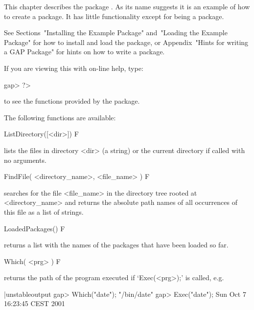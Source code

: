 

This chapter  describes  the  {\GAP}  package  {\Example}.  As  its  name
suggests it is an example of how to  create  a  {\GAP}  package.  It  has
little functionality except for being a package.

See Sections~"Installing the Example Package"  and~"Loading  the  Example
Package"  for  how  to  install  and  load  the  {\Example}  package,  or
Appendix~"Hints for writing a GAP Package" for hints on how  to  write  a
{\GAP} package.

If you are viewing this with on-line help, type: 

\beginexample
gap> ?>
\endexample

to see the functions provided by the {\Example} package.


The following functions are available:

\>ListDirectory([<dir>]) F

lists the files in directory <dir> (a string) or the current directory if
called with no arguments.

\>FindFile( <directory_name>, <file_name> ) F

searches  for the  file   <file_name> in  the  directory  tree  rooted at
<directory_name> and returns the absolute path names of  all  occurrences
of this file as a list of strings.

\>LoadedPackages() F

returns a list with the names of the packages that have  been  loaded  so
far.

\>Which( <prg> ) F

returns the path of the program executed if `Exec(<prg>);' is called, e.g.

\beginexample|unstableoutput
gap> Which("date");         
"/bin/date"
gap> Exec("date");
Sun Oct  7 16:23:45 CEST 2001
\endexample

